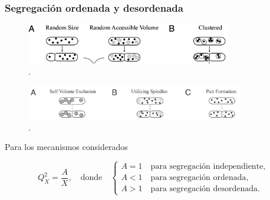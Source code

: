 \documentclass{beamer}
\begin{document}
\begin{frame}
\frametitle{Segregaci\'on ordenada y desordenada}

\begin{figure}[p]
    \centering
    \includegraphics[width=0.8\textwidth]{order.png}\\
    \tiny \cite{huh11b}.
\end{figure}

\begin{figure}[p]
    \centering
    \includegraphics[width=0.85\textwidth]{disorder.png}\\
    \tiny \cite{huh11b}.
\end{figure}

Para los mecanismos considerados

$$ Q_X^2 = \frac{A}{X}, \quad \text{donde} \quad 
\begin{cases}
A = 1 \quad \text{para segregaci\'on independiente,}\\
A < 1 \quad \text{para segregaci\'on ordenada,}\\
A > 1 \quad \text{para segregaci\'on desordenada.}
\end{cases} 
$$

\end{frame}
\end{document}
